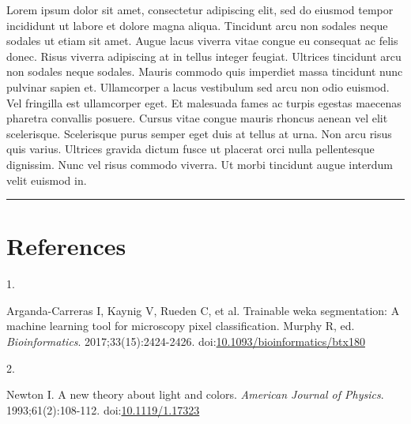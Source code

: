 \documentclass[
]{article}
\newlength{\cslhangindent}
\newlength{\csllabelwidth}
\newlength{\cslentryspacingunit} %
\newenvironment{CSLReferences}[2] %
 {%
  \setlength{\parindent}{0pt}
  \ifodd #1
  \let\oldpar\par
  \def\par{\hangindent=\cslhangindent\oldpar}
  \fi
  \setlength{\parskip}{#2\cslentryspacingunit}
 }%
 {}
\newcommand{\CSLLeftMargin}[1]{\parbox[t]{\csllabelwidth}{#1}}
\newcommand{\CSLRightInline}[1]{\parbox[t]{\linewidth - \csllabelwidth}{#1}\break}
\begin{document}
Lorem ipsum dolor sit amet, consectetur adipiscing elit, sed do eiusmod tempor incididunt ut labore et dolore magna aliqua. Tincidunt arcu non sodales neque sodales ut etiam sit amet. Augue lacus viverra vitae congue eu consequat ac felis donec. Risus viverra adipiscing at in tellus integer feugiat. Ultrices tincidunt arcu non sodales neque sodales. Mauris commodo quis imperdiet massa tincidunt nunc pulvinar sapien et. Ullamcorper a lacus vestibulum sed arcu non odio euismod. Vel fringilla est ullamcorper eget. Et malesuada fames ac turpis egestas maecenas pharetra convallis posuere. Cursus vitae congue mauris rhoncus aenean vel elit scelerisque. Scelerisque purus semper eget duis at tellus at urna. Non arcu risus quis varius. Ultrices gravida dictum fusce ut placerat orci nulla pellentesque dignissim. Nunc vel risus commodo viverra. Ut morbi tincidunt augue interdum velit euismod in.

\begin{center}\rule{0.5\linewidth}{0.5pt}\end{center}

\hypertarget{references}{%
\section{References}\label{references}}

\hypertarget{refs}{}
\begin{CSLReferences}{0}{0}
\leavevmode{}%
\CSLLeftMargin{1. }%
\CSLRightInline{Arganda-Carreras I, Kaynig V, Rueden C, et al. Trainable weka segmentation: A machine learning tool for microscopy pixel classification. Murphy R, ed. \emph{Bioinformatics}. 2017;33(15):2424-2426. doi:\href{https://doi.org/10.1093/bioinformatics/btx180}{10.1093/bioinformatics/btx180}}

\leavevmode{}%
\CSLLeftMargin{2. }%
\CSLRightInline{Newton I. A new theory about light and colors. \emph{American Journal of Physics}. 1993;61(2):108-112. doi:\href{https://doi.org/10.1119/1.17323}{10.1119/1.17323}}

\end{CSLReferences}
\end{document}
